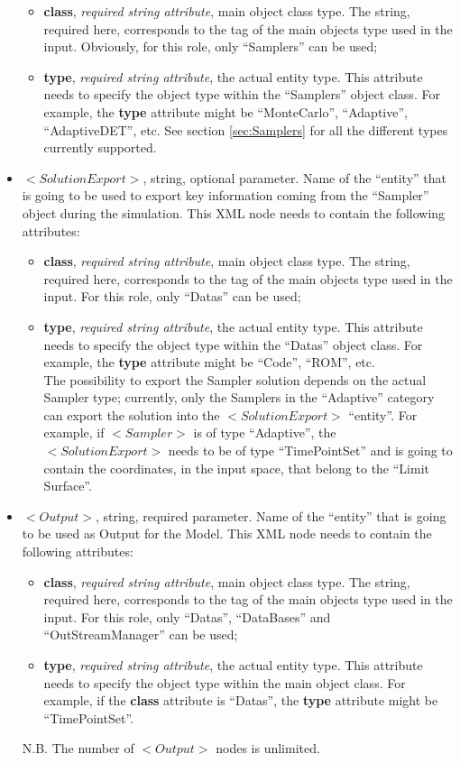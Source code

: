 \begin{itemize}
\begin{itemize}
  \item \textbf{class}, \textit{required string attribute}, main object class type. The string, required here, corresponds to the tag of the main objects type used in the input. Obviously, for this role, only ``Samplers'' can be used;
  \item \textbf{type}, \textit{required string attribute}, the actual entity type. This attribute needs to specify the object type within the ``Samplers'' object class. For example, the \textbf{type} attribute might be ``MonteCarlo'', ``Adaptive'', ``AdaptiveDET'', etc. See section \ref{sec:Samplers} for all the different types currently supported.
\end{itemize}
\item $<SolutionExport>$, string, optional parameter. Name of the ``entity'' that is going to be used to export key information coming from the ``Sampler'' object during the simulation. This XML node needs to contain the following attributes:
\begin{itemize}
  \item \textbf{class}, \textit{required string attribute}, main object class type. The string, required here, corresponds to the tag of the main objects type used in the input. For this role, only ``Datas'' can be used;
  \item \textbf{type}, \textit{required string attribute}, the actual entity type. This attribute needs to specify the object type within the ``Datas'' object class. For example, the \textbf{type} attribute might be ``Code'', ``ROM'', etc. 
\\The possibility to export the Sampler solution depends on the actual Sampler type; currently, only the Samplers in the ``Adaptive'' category can export the solution into the $<SolutionExport>$ ``entity''. For example, if  $<Sampler>$ is of type ``Adaptive'', the $<SolutionExport>$ needs to be of type ``TimePointSet'' and is going to contain the coordinates, in the input space, that belong to the ``Limit Surface''. 
\end{itemize}
\item $<Output>$, string, required parameter. Name of the ``entity'' that is going to be used as Output for the Model. This XML node needs to contain the following attributes:
\begin{itemize}
  \item \textbf{class}, \textit{required string attribute}, main object class type. The string, required here, corresponds to the tag of the main objects type used in the input. For this role, only ``Datas'', ``DataBases'' and ``OutStreamManager'' can be used;
  \item \textbf{type}, \textit{required string attribute}, the actual entity type. This attribute needs to specify the object type within the main object class. For example, if the  \textbf{class} attribute is ``Datas'', the \textbf{type} attribute might be ``TimePointSet''.
\end{itemize}
N.B. The number of $<Output>$ nodes is unlimited.
\end{itemize}

